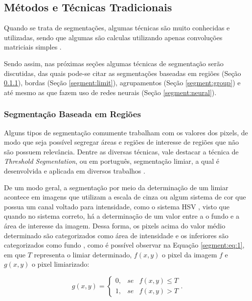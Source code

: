 \subsection{Métodos e Técnicas Tradicionais}
\label{segment:segment}

Quando se trata de segmentações, algumas técnicas são muito conhecidas e utilizadas, sendo que algumas são calculas utilizando apenas convoluções matriciais simples \cite{Yuheng2017}.

Sendo assim, nas próximas seções algumas técnicas de segmentação serão discutidas, das quais pode-se citar as segmentações baseadas em regiões (Seção \ref{segment:region}), bordas  (Seção \ref{segment:limit}), agrupamentos  (Seção \ref{segment:group}) e até mesmo as que fazem uso de redes neurais  (Seção \ref{segment:neural}).

\subsubsection{Segmentação Baseada em Regiões}
\label{segment:region}

Alguns tipos de segmentação comumente trabalham com os valores dos pixels, de modo que seja possível segregar áreas e regiões de interesse de regiões que não são possuem relevância. Dentre as diversas técnicas, vale destacar a técnica de \textit{Threshold Segmentation}, ou em português, segmentação limiar, a qual é desenvolvida e aplicada em diversos trabalhos \cite{Yanowitz1989}.

De um modo geral, a segmentação por meio da determinação de um limiar acontece em imagens que utilizam a escala de cinza ou algum sistema de cor que possua um canal voltado para intensidade, como o sistema HSV \cite{schneider2003experimentos}, visto que quando no sistema correto, há a determinação de um valor entre a o fundo e a área de interesse da imagem. Dessa forma, os pixels acima do valor médio determinado são categorizados como área de intensidade e os inferiores são categorizados como fundo \cite{pedrini2008analise}, como é possível observar na Equação \ref{segment:eq:1}, em que $T$ representa o limiar determinado, $f(x,y)$ o pixel da imagem $f$ e $g(x,y)$ o pixel limiarizado:

\begin{equation}
\label{segment:eq:1}
    g(x,y) = \left\{\begin{matrix}
        0, & se & f(x,y) \leq T\\ 
        1, & se & f(x,y) > T
    \end{matrix}\right
    ..
\end{equation}

